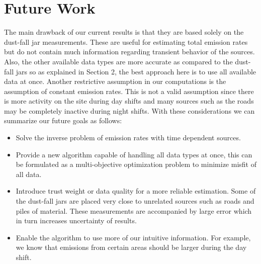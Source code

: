 \documentclass[11pt]{article}
\begin{document}
\section{Future Work}
The main drawback of our current results is that they are based solely on 
the dust-fall jar measurements. These are useful for estimating total 
emission rates but do not contain much information regarding transient 
behavior of the sources. Also, the other available data 
types are more accurate as compared to the dust-fall jars so as explained 
in Section 2, the best approach here is to use all available data at 
once. Another restrictive assumption in our computations is the 
assumption of constant emission rates. This is not a valid assumption 
since there is more activity on the site during day shifts and many 
sources such as the roads may be completely inactive during night shifts.
With these considerations we can summarize our future goals as follows:
\begin{itemize}
\item Solve the inverse problem of emission rates with time dependent 
sources. 
\item Provide a new algorithm capable of handling all data types 
at once, this can be formulated as a multi-objective optimization 
problem to minimize misfit of all data.
\item Introduce trust weight or data quality for a more reliable
estimation. Some of the dust-fall jars are placed very close to 
unrelated sources such as roads and piles of material. These measurements 
are accompanied by large error which in turn increases uncertainty of 
results.
\item Enable the algorithm to use more of our intuitive information.
For example, we know that emissions from certain areas should be larger 
during the day shift. 
\end{itemize}


\end{document}
